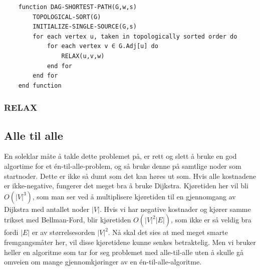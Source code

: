 \begin{lstlisting}
    function DAG-SHORTEST-PATH(G,w,s)
    	TOPOLOGICAL-SORT(G)
    	INITIALIZE-SINGLE-SOURCE(G,s)
    	for each vertex u, taken in topologically sorted order do
    		for each vertex v ∈ G.Adj[u] do
    			RELAX(u,v,w)
    		end for
    	end for
    end function
\end{lstlisting}

\subsubsection{RELAX}

\subsection{Alle til alle}
En soleklar måte å takle dette problemet på, er rett og slett å bruke en god algortime for et én-til-alle-problem, og så bruke denne på samtlige noder som startnoder. Dette er ikke så dumt som det kan høres ut som. Hvis alle kostnadene er ikke-negative, fungerer det meget bra å bruke Dijkstra. Kjøretiden her vil bli $O(|V|^3)$, som man ser ved å multiplisere kjøretiden til en gjennomgang av Dijkstra med antallet noder $|V|$. Hvis vi har negative kostnader og kjører samme trikset med Bellman-Ford, blir kjøretiden $O(|V|^2 |E|)$, som ikke er så veldig bra fordi $|E|$ er av størrelsesorden $|V|^2$. Nå skal det sies at med meget smarte fremgangsmåter her, vil disse kjøretidene kunne senkes betraktelig. Men vi bruker heller en algoritme som tar for seg problemet med alle-til-alle uten å skulle gå omveien om mange gjennomkjøringer av en én-til-alle-algoritme.

